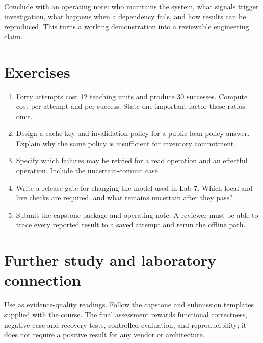 Conclude with an operating note: who maintains the system, what signals trigger investigation, what happens when a dependency fails, and how results can be reproduced. This turns a working demonstration into a reviewable engineering claim.

\section{Exercises}
\begin{enumerate}
\item Forty attempts cost 12 teaching units and produce 30 successes. Compute cost per attempt and per success. State one important factor these ratios omit.
\item Design a cache key and invalidation policy for a public loan-policy answer. Explain why the same policy is insufficient for inventory commitment.
\item Specify which failures may be retried for a read operation and an effectful operation. Include the uncertain-commit case.
\item Write a release gate for changing the model used in Lab 7. Which local and live checks are required, and what remains uncertain after they pass?
\item Submit the capstone package and operating note. A reviewer must be able to trace every reported result to a saved attempt and rerun the offline path.
\end{enumerate}

\section{Further study and laboratory connection}
Use \cite{scientific-report,acceleration-report} as evidence-quality readings. Follow the capstone and submission templates supplied with the course. The final assessment rewards functional correctness, negative-case and recovery tests, controlled evaluation, and reproducibility; it does not require a positive result for any vendor or architecture.


